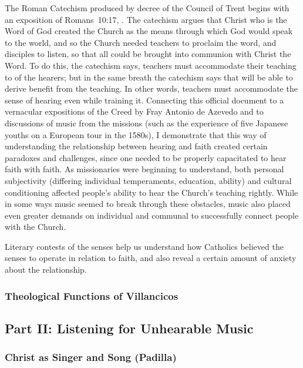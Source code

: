 \documentclass[tt]{vcbook-proposal}
\begin{document}
The Roman Catechism produced by decree of the Council of Trent begins with an exposition of Romans~10:17, .
The catechism argues that Christ who is the Word of God created the Church as the means through which God would speak to the world, and so the Church needed teachers to proclaim the word, and disciples to listen, so that all could be brought into communion with Christ the Word.
To do this, the catechism says, teachers must accommodate their teaching to  of the hearers; but in the same breath the catechism says that  will be able to derive benefit from the teaching.
In other words, teachers must accommodate the sense of hearing even while training it.
Connecting this official document to a vernacular expositions of the Creed by Fray Antonio de Azevedo and to discussions of music from the missions (such as the experience of five Japanese youths on a European tour in the 1580s), I demonstrate that this way of understanding the relationship between hearing and faith created certain paradoxes and challenges, since one needed to be properly capacitated to hear faith with faith.
As missionaries were beginning to understand, both personal subjectivity (differing individual temperaments, education, ability) and cultural conditioning affected people's ability to hear the Church's teaching rightly.
While in some ways music seemed to break through these obstacles, music also placed even greater demands on individual and communal  to successfully connect people with the Church.

Literary contests of the senses help us understand how Catholics believed the senses to operate in relation to faith, and also reveal a certain amount of anxiety about the relationship.


\subsubsection{Theological Functions of Villancicos}


\subsection{Part II: Listening for Unhearable Music}

\subsubsection{Christ as Singer and Song (Padilla)}
\end{document}
